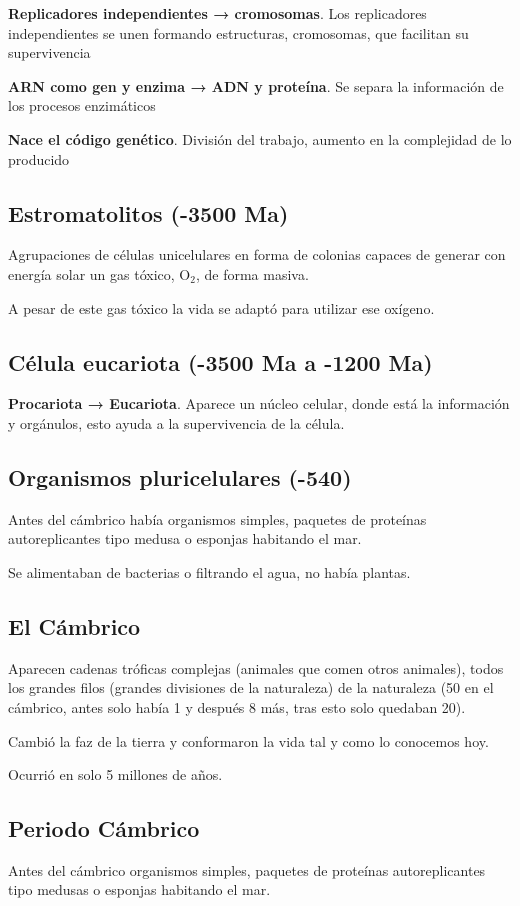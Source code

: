 \documentclass[12pt, twoside, openright]{report} %
\begin{document}
\textbf{Replicadores independientes → cromosomas}. Los replicadores independientes se unen formando estructuras, cromosomas, que facilitan su supervivencia

\textbf{ARN como gen y enzima → ADN y proteína}. Se separa la información de los procesos enzimáticos

\textbf{Nace el código genético}. División del trabajo, aumento en la complejidad de lo producido

\subsection{Estromatolitos (-3500 Ma)}
Agrupaciones de células unicelulares en forma de colonias capaces de generar con energía solar un gas tóxico, O$_2$, de forma masiva.

A pesar de este gas tóxico la vida se adaptó para utilizar ese oxígeno.

\subsection{Célula eucariota (-3500 Ma a -1200 Ma)}
\textbf{Procariota → Eucariota}. Aparece un núcleo celular, donde está la información y orgánulos, esto ayuda a la supervivencia de la célula.

\subsection{Organismos pluricelulares (-540)}
Antes del cámbrico había organismos simples, paquetes de proteínas autoreplicantes tipo medusa o esponjas habitando el mar.

Se alimentaban de bacterias o filtrando el agua, no había plantas.

\subsection{El Cámbrico}
Aparecen cadenas tróficas complejas (animales que comen otros animales), todos los grandes filos (grandes divisiones de la naturaleza) de la naturaleza (50 en el cámbrico, antes solo había 1 y después 8 más, tras esto solo quedaban 20).

Cambió la faz de la tierra y conformaron la vida tal y como lo conocemos hoy.

Ocurrió en solo 5 millones de años.

\subsection{Periodo Cámbrico}
Antes del cámbrico organismos simples, paquetes de proteínas autoreplicantes tipo medusas o esponjas habitando el mar.
\end{document}
